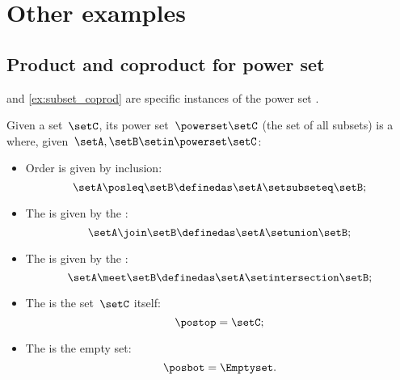 
\section{Other examples}

\subsection{Product and coproduct for power set}
 and \cref{ex:subset_coprod} are specific instances of the power set .

\begin{ctdefinition}
    \label{def:power-set-as-lattice}
    Given a set~$\setC$, its power set~$\powerset \setC$ (the set of all subsets) is a  where, given~$\setA,\setB\setin \powerset \setC$:
    \begin{itemize}
        \item Order is given by inclusion:
              \begin{equation}
                  \setA\posleq \setB \definedas \setA\setsubseteq \setB;
              \end{equation}
        \item The  is given by the :
              \begin{equation}
                  \setA\join \setB \definedas \setA\setunion \setB;
              \end{equation}
        \item The  is given by the :
              \begin{equation}
                  \setA\meet \setB \definedas \setA\setintersection \setB;
              \end{equation}
        \item The  is the set~$\setC$ itself:
              \begin{equation}
                  \postop = \setC;
              \end{equation}
        \item The  is the empty set:
              \begin{equation}
                  \posbot = \Emptyset.
              \end{equation}
    \end{itemize}
\end{ctdefinition}

